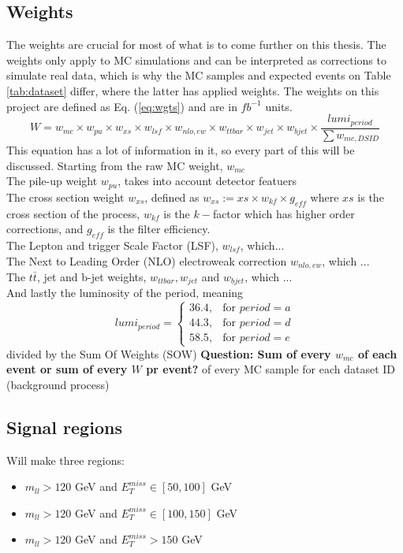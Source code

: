 \documentclass[14pt, a4paper]{book}
\begin{document}
\subsection{Weights}\label{sec:wgts}
The weights are crucial for most of what is to come further on this thesis. The weights only apply to MC simulations and can be interpreted as corrections to simulate real data, which is why the MC samples and expected events on Table \ref{tab:dataset} differ, where the 
latter has applied weights. The weights on this project are defined as Eq. (\ref{eq:wgts}) and are in $fb^{-1}$ units.
\begin{equation}\label{eq:wgts}
   W = w_{mc}\times w_{pu}\times w_{xs}\times w_{lsf} \times w_{nlo,ew} \times w_{ttbar} \times w_{jet} \times w_{bjet} \times \frac{lumi_{period}}{\sum w_{mc, DSID}}
\end{equation}
This equation has a lot of information in it, so every part of this will be discussed. Starting from the raw MC weight, $w_{mc}$\\
The pile-up weight $w_{pu}$, takes into account detector featuers\\
The cross section weight $w_{xs}$, defined as $w_{xs} := xs \times w_{kf} \times g_{eff}$ where $xs$ is the cross section of the process, $w_{kf}$ is the $k-$factor which has higher order corrections, and $g_{eff}$ is the filter efficiency.\\
The Lepton and trigger Scale Factor (LSF), $w_{lsf}$, which...\\
The Next to Leading Order (NLO) electroweak correction $w_{nlo,ew}$, which ...\\
The $t\bar{t}$, jet and b-jet weights, $w_{ttbar}, w_{jet}$ and $w_{bjet}$, which ...\\
And lastly the luminosity of the period, meaning
$$
lumi_{period} = \begin{cases}
               36.4,& \text{for } period = a\\
               44.3,& \text{for } period = d\\
               58.5,& \text{for } period = e
               \end{cases}
$$
divided by the Sum Of Weights (SOW) \textbf{Question: Sum of every $w_{mc}$ of each event or sum of every $W$ pr event? } of every MC sample for each dataset ID (background process)

\subsection{Signal regions}
Will make three regions:
\begin{itemize}
   \item $m_{ll} >120$ GeV and $E_T^{miss} \in [50, 100]$ GeV
   \item $m_{ll} >120$ GeV and $E_T^{miss} \in [100, 150]$ GeV
   \item $m_{ll} >120$ GeV and $E_T^{miss} >150$ GeV
\end{itemize}
\end{document}
